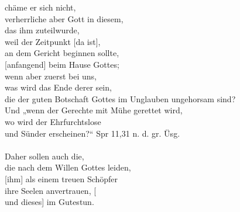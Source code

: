                 chäme er sich nicht, \\
                verherrliche aber Gott in diesem, \\
                das ihm zuteilwurde, \\
                    weil der Zeitpunkt [da ist], \\
                    an dem Gericht beginnen sollte, \\
                        [anfangend] beim Hause Gottes; \\
                    wenn aber zuerst bei uns, \\
                        was wird das Ende derer sein, \\
                        die der guten Botschaft Gottes im Unglauben ungehorsam sind? \\
            Und „wenn der Gerechte mit Mühe gerettet wird, \\
                wo wird der Ehrfurchtslose \\
                und Sünder erscheinen?“ {Spr 11,31 n. d. gr. Üsg.} \\
\\
            Daher sollen auch die, \\
                die nach dem Willen Gottes leiden, \\
                [ihm] als einem treuen Schöpfer \\
                ihre Seelen anvertrauen, [\\
                und dieses] im Gutestun. \\


